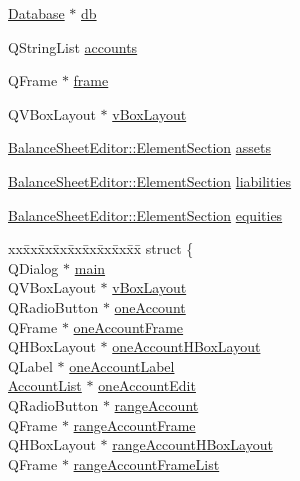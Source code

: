 \begin{CompactItemize}
\item 
\hyperlink{classDatabase}{Database} $\ast$ \hyperlink{classBalanceSheetEditor_r0}{db}
\item 
QString\-List \hyperlink{classBalanceSheetEditor_r1}{accounts}
\item 
QFrame $\ast$ \hyperlink{classBalanceSheetEditor_r2}{frame}
\item 
QVBox\-Layout $\ast$ \hyperlink{classBalanceSheetEditor_r3}{v\-Box\-Layout}
\item 
\hyperlink{structBalanceSheetEditor_1_1ElementSection}{Balance\-Sheet\-Editor::Element\-Section} \hyperlink{classBalanceSheetEditor_r4}{assets}
\item 
\hyperlink{structBalanceSheetEditor_1_1ElementSection}{Balance\-Sheet\-Editor::Element\-Section} \hyperlink{classBalanceSheetEditor_r5}{liabilities}
\item 
\hyperlink{structBalanceSheetEditor_1_1ElementSection}{Balance\-Sheet\-Editor::Element\-Section} \hyperlink{classBalanceSheetEditor_r6}{equities}
\item 
\begin{tabbing}
xx\=xx\=xx\=xx\=xx\=xx\=xx\=xx\=xx\=\kill
struct \{\\
\>QDialog $\ast$ \hyperlink{classBalanceSheetEditor_r7}{main}\\
\>QVBoxLayout $\ast$ \hyperlink{classBalanceSheetEditor_r8}{vBoxLayout}\\
\>QRadioButton $\ast$ \hyperlink{classBalanceSheetEditor_r9}{oneAccount}\\
\>QFrame $\ast$ \hyperlink{classBalanceSheetEditor_r10}{oneAccountFrame}\\
\>QHBoxLayout $\ast$ \hyperlink{classBalanceSheetEditor_r11}{oneAccountHBoxLayout}\\
\>QLabel $\ast$ \hyperlink{classBalanceSheetEditor_r12}{oneAccountLabel}\\
\>\hyperlink{classAccountList}{AccountList} $\ast$ \hyperlink{classBalanceSheetEditor_r13}{oneAccountEdit}\\
\>QRadioButton $\ast$ \hyperlink{classBalanceSheetEditor_r14}{rangeAccount}\\
\>QFrame $\ast$ \hyperlink{classBalanceSheetEditor_r15}{rangeAccountFrame}\\
\>QHBoxLayout $\ast$ \hyperlink{classBalanceSheetEditor_r16}{rangeAccountHBoxLayout}\\
\>QFrame $\ast$ \hyperlink{classBalanceSheetEditor_r17}{rangeAccountFrameList}\\

\end{tabbing}
\end{CompactItemize}
